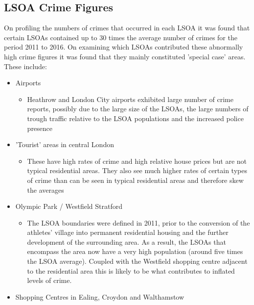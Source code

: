 \documentclass{article}
\begin{document}
\subsection{LSOA Crime Figures}
On profiling the numbers of crimes that occurred in each LSOA it was found that certain LSOAs contained up to 30 times the average number of crimes for the period 2011 to 2016. On examining which LSOAs contributed these abnormally high crime figures it was found that they mainly constituted 'special case' areas. These include:
\begin{itemize}
\item Airports
\begin{itemize}
\item Heathrow and London City airports exhibited large number of crime reports, possibly due to the large size of the LSOAs, the large numbers of trough traffic relative to the LSOA populations and the increased police presence
\end{itemize}

\item 'Tourist' areas in central London
\begin{itemize}
\item These have high rates of crime and high relative house prices but are not typical residential areas. They also see much higher rates of certain types of crime than can be seen in typical residential areas and therefore skew the averages
\end{itemize}

\item Olympic Park / Westfield Stratford
\begin{itemize}
\item The LSOA boundaries were defined in 2011, prior to the conversion of the athletes' village into permanent residential housing and the further development of the surrounding area. As a result, the LSOAs that encompass the area now have a very high population (around five times the LSOA average). Coupled with the Westfield shopping centre adjacent to the residential area this is likely to be what contributes to inflated levels of crime.
\end{itemize}

\item Shopping Centres in Ealing, Croydon and Walthamstow

\end{itemize}
\bigskip
\end{document}

